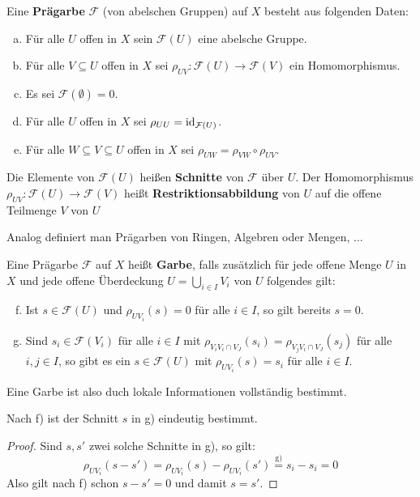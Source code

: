 \begin{defn}
\label{defn:1.1}
	Eine \textbf{Prägarbe} $\mathcal{F}$ (von abelschen Gruppen) auf $X$ besteht aus folgenden Daten:
	\begin{enumerate}[a)]
		\item Für alle $U$ offen in $X$ sein $\mathcal{F}(U)$ eine abelsche Gruppe.
		\item Für alle $V \subseteq U$ offen in $X$ sei $\rho_{UV}:\mathcal{F}(U)\to\mathcal{F}(V)$ ein Homomorphismus.
		\item Es sei $\mathcal{F}(\emptyset) = 0$.
		\item Für alle $U$ offen in $X$ sei $\rho_{UU} = \operatorname{id}_{\mathcal{F}(U)}$.
		\item Für alle $W \subseteq V \subseteq U$ offen in $X$ sei $\rho_{UW} = \rho_{VW} \circ \rho_{UV}$.
	\end{enumerate}
	Die Elemente von $\mathcal{F}(U)$ heißen \textbf{Schnitte} von $\mathcal{F}$ über $U$. Der Homomorphismus $\rho_{UV}:\mathcal{F}(U)\to\mathcal{F}(V)$ heißt \textbf{Restriktionsabbildung} von $U$ auf die offene Teilmenge $V$ von $U$
\end{defn}

\begin{bem}
	Analog definiert man Prägarben von Ringen, Algebren oder Mengen, ...
\end{bem}

\begin{defn}
	Eine Prägarbe $\mathcal{F}$ auf $X$ heißt \textbf{Garbe}, falls zusätzlich für jede offene Menge $U$ in $X$ und jede offene Überdeckung $U=\bigcup_{i \in I}V_i$ von $U$ folgendes gilt:
	\begin{enumerate}[a)]
		\setcounter{enumi}{5}
		\item Ist $s \in \mathcal{F}(U)$ und $\rho_{UV_i}(s) = 0$ für alle $i \in I$, so gilt bereits $s=0$.
		\item Sind $s_i \in \mathcal{F}(V_i)$ für alle $i \in I$ mit $\rho_{V_i V_i \cap V_J}(s_i) = \rho_{V_j V_i \cap V_J}(s_j)$ für alle $i,j \in I$, so gibt es ein $s \in \mathcal{F}(U)$ mit $\rho_{UV_i}(s) = s_i$ für alle $i \in I$.
	\end{enumerate}
	Eine Garbe ist also duch lokale Informationen vollständig bestimmt.
\end{defn}

\begin{bem}
	Nach f) ist der Schnitt $s$ in g) eindeutig bestimmt.
	\begin{proof}
		Sind $s, s'$ zwei solche Schnitte in g), so gilt:
		\[
			\rho_{UV_i}(s-s') = \rho_{UV_i}(s) - \rho_{UV_i}(s') \overset{\text{g)}}{=}s_i-s_i = 0 
		\]
		Also gilt nach f) schon $s-s'=0$ und damit $s=s'$.
	\end{proof}
\end{bem}

